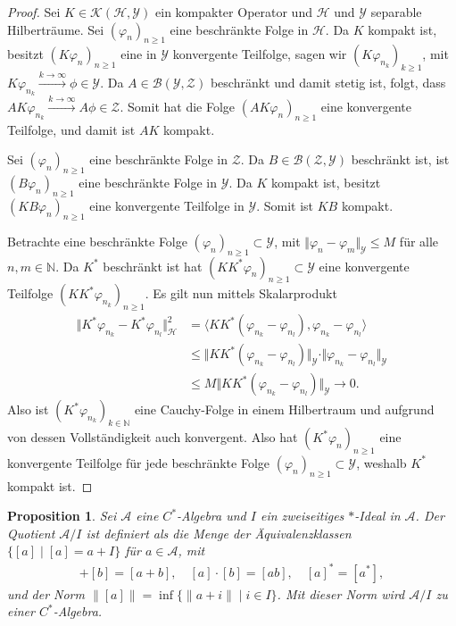 \documentclass[11pt, hidelinks]{article}
\newcommand{\h}{\mathcal{H}}
\numberwithin{conj}{section}
\newtheorem{proposition}[conj]{Proposition}
\begin{document}
\begin{proof}
Sei \( K \in \mathcal{K}(\h, \mathcal{Y}) \) ein kompakter Operator und \( \h \) und \( \mathcal{Y} \) separable Hilberträume. Sei \( (\varphi_n)_{n \geq 1} \) eine beschränkte Folge in \( \h \). Da \( K \) kompakt ist, besitzt \( (K\varphi_n)_{n \geq 1} \) eine in \( \mathcal{Y} \) konvergente Teilfolge, sagen wir \( (K\varphi_{n_k})_{k \geq 1} \), mit \( K\varphi_{n_k} \xrightarrow[]{k \rightarrow \infty} \phi \in \mathcal{Y} \). Da \( A \in \mathcal{B}(\mathcal{Y}, \mathcal{Z}) \) beschränkt und damit stetig ist, folgt, dass \( A K\varphi_{n_k} \xrightarrow[]{k \rightarrow \infty} A\phi \in \mathcal{Z} \). Somit hat die Folge \( (AK\varphi_n)_{n \geq 1} \) eine konvergente Teilfolge, und damit ist \( AK \) kompakt.

Sei \( (\varphi_n)_{n \geq 1} \) eine beschränkte Folge in \( \mathcal{Z} \). Da \( B \in \mathcal{B}(\mathcal{Z}, \mathcal{Y}) \) beschränkt ist, ist \( (B\varphi_n)_{n \geq 1} \) eine beschränkte Folge in \( \mathcal{Y} \). Da \( K \) kompakt ist, besitzt \( (KB\varphi_n)_{n \geq 1} \) eine konvergente Teilfolge in \( \mathcal{Y} \). Somit ist \( KB \) kompakt.

Betrachte eine beschränkte Folge $(\varphi_n)_{n \geq 1} \subset \mathcal{Y}$, mit $\Vert \varphi_n - \varphi_m \Vert_{\mathcal{Y}} \leq M$ für alle $n,m \in \mathbb{N}$. Da $K^\ast$ beschränkt ist hat $(KK^\ast\varphi_n)_{n \geq 1} \subset \mathcal{Y}$ eine konvergente Teilfolge $(KK^\ast\varphi_{n_k})_{n \geq 1}$. Es gilt nun mittels Skalarprodukt
\begin{align}
    \Vert K^\ast \varphi_{n_k} - K^\ast\varphi_{n_l} \Vert^2_\h &= \langle KK^\ast (\varphi_{n_k} - \varphi_{n_l}), \varphi_{n_k} - \varphi_{n_l} \rangle \\
    &\leq \Vert KK^\ast (\varphi_{n_k} - \varphi_{n_l}) \Vert_{\mathcal{Y}} \cdot \Vert \varphi_{n_k} - \varphi_{n_l} \Vert_{\mathcal{Y}} \\
    &\leq M \Vert KK^\ast (\varphi_{n_k} - \varphi_{n_l}) \Vert_{\mathcal{Y}} \to 0.
\end{align}
Also ist $(K^\ast \varphi_{n_k})_{k \in \mathbb{N}}$ eine Cauchy-Folge in einem Hilbertraum und aufgrund von dessen Vollständigkeit auch konvergent. Also hat $(K^\ast \varphi_{n})_{n \geq 1}$ eine konvergente Teilfolge für jede beschränkte Folge $(\varphi_n)_{n \geq 1} \subset \mathcal{Y}$, weshalb $K^\ast$ kompakt ist.
\end{proof}

\begin{proposition}
Sei \( \mathcal{A} \) eine \( C^\ast \)-Algebra und \( I \) ein zweiseitiges \(\ast\)-Ideal in \( \mathcal{A} \). Der Quotient \( \mathcal{A}/I \) ist definiert als die Menge der Äquivalenzklassen \( \{[a] \mid [a] = a + I \} \) für \( a \in \mathcal{A} \), mit
\begin{align}
    [a] + [b] = [a + b], \quad [a] \cdot [b] = [a b], \quad [a]^* = [a^*],
\end{align}
und der Norm $\| [a] \| = \inf \{ \| a + i \| \mid i \in I \}$. Mit dieser Norm wird \( \mathcal{A}/I \) zu einer \( C^\ast \)-Algebra.
\end{proposition}
\end{document}
